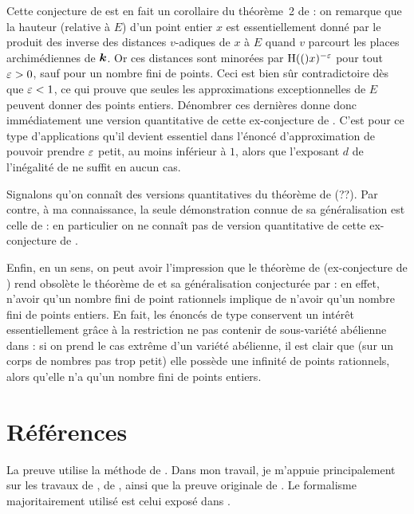 Cette conjecture de  est en fait un corollaire du théorème~2 de
\cite{falda} : on remarque que la hauteur (relative à $E$) d'un point
entier $x$ est essentiellement donné par le produit des inverse des distances
$v$-adiques de $x$ à $E$ quand $v$ parcourt les places archimédiennes de
$\boldsymbol{k}$. Or ces distances sont minorées par $\operatorname{H}(()x)^{-\varepsilon}$ pour tout
$\varepsilon>0$, sauf pour un nombre fini de points. Ceci est bien sûr contradictoire
dès que $\varepsilon < 1$, ce qui prouve que seules les approximations
exceptionnelles de $E$ peuvent donner des points entiers. Dénombrer ces
dernières donne donc immédiatement une version quantitative de cette
ex-conjecture de . C'est pour ce type d'applications qu'il devient
essentiel dans l'énoncé d'approximation de pouvoir prendre $\varepsilon$ petit, au
moins inférieur à $1$, alors que l'exposant $d$ de l'inégalité de
 ne suffit en aucun cas.

Signalons qu'on connaît des versions quantitatives du théorème de 
(??). Par contre, à ma connaissance, la seule démonstration connue de sa
généralisation est celle de  : en particulier on ne connaît pas
de version quantitative de cette ex-conjecture de .

Enfin, en un sens, on peut avoir l'impression que le théorème de
 (ex-conjecture de ) rend obsolète le théorème
de  et sa généralisation conjecturée par  : en effet,
n'avoir qu'un nombre fini de point rationnels implique de n'avoir qu'un
nombre fini de points entiers. En fait, les énoncés de type 
conservent un intérêt essentiellement grâce à la restriction \og ne pas
contenir de sous-variété abélienne \fg dans  : si on prend
le cas extrême d'un variété abélienne, il est clair que (sur un corps de
nombres pas trop petit) elle possède une infinité de points rationnels, alors
qu'elle n'a qu'un nombre fini de points entiers.

\ifdefined\publicversion
\section{Références}

La preuve utilise la méthode de . Dans mon travail, je m'appuie
principalement sur les travaux de  \cite{remivds,remivg,remdcl},
de  \cite{farhith}, ainsi que la preuve originale de 
\cite{falda}. Le formalisme majoritairement utilisé est celui exposé dans
\cite{pphdg, remgdmp}.

